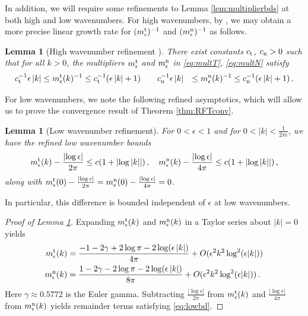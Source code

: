 \documentclass[11pt,reqno]{amsart}
\newcommand{\abs}[1]{\left\lvert #1 \right\rvert}
\numberwithin{equation}{section}
\newtheorem{lemma}[theorem]{Lemma}
\theoremstyle{definition}
\begin{document}
%
In addition, we will require some refinements to Lemma \ref{lem:multiplierbds} at both high and low wavenumbers. For high wavenumbers, by \cite[Proposition 1.4]{inverse}, we may obtain a more precise linear growth rate for $(m_\epsilon^{\rm t})^{-1}$ and $(m_\epsilon^{\rm n})^{-1}$ as follows.  
\begin{lemma}[High wavenumber refinement \cite{inverse}]\label{lem:highk_refinement}
There exist constants $c_{\rm t}$, $c_{\rm n}>0$ such that for all $k>0$, the multipliers $m_\epsilon^{\rm t}$ and $m_\epsilon^{\rm n}$ in \eqref{eq:multT}, \eqref{eq:multN} satisfy 
   \begin{equation}
   \begin{aligned}
    c_{\rm t}^{-1}\epsilon\abs{k} &\le m_\epsilon^{\rm t}(k)^{-1} \le c_{\rm t}^{-1}(\epsilon\abs{k}+1)
    \qquad
    c_{\rm n}^{-1}\epsilon\abs{k} &\le m_\epsilon^{\rm n}(k)^{-1} \le c_{\rm n}^{-1}(\epsilon\abs{k}+1)\,.
    \end{aligned}
  \end{equation}
\end{lemma}
%
%
For low wavenumbers, we note the following refined asymptotics, which will allow us to prove the convergence result of Theorem \ref{thm:RFTconv}. 
%
\begin{lemma}[Low wavenumber refinement]\label{lem:lowk_refine}
  For $0<\epsilon<1$ and for $0< \abs{k}<\frac{1}{2\pi\epsilon}$, we have the refined low wavenumber bounds
\begin{equation}\label{eq:lowbd}
  m_\epsilon^{\rm t}(k) - \frac{\abs{\log\epsilon}}{2\pi} \le c(1+\abs{\log \abs{k}})\,,
  \quad
  m_\epsilon^{\rm n}(k) - \frac{\abs{\log\epsilon}}{4\pi} \le c(1+\abs{\log \abs{k}})\,,
\end{equation}
along with $m_\epsilon^{\rm t}(0) - \frac{\abs{\log\epsilon}}{2\pi}=m_\epsilon^{\rm n}(0) - \frac{\abs{\log\epsilon}}{4\pi}=0$.
\end{lemma}
In particular, this difference is bounded independent of $\epsilon$ at low wavenumbers. 


\begin{proof}[Proof of Lemma \ref{lem:lowk_refine}]
Expanding $m_\epsilon^{\rm t}(k)$ and $m_\epsilon^{\rm n}(k)$ in a Taylor series about $\abs{k}=0$ yields 
\begin{equation}
\begin{aligned}
  m_\epsilon^{\rm t}(k) &= \frac{-1-2\gamma +2\log\pi -2\log(\epsilon \abs{k})}{4\pi} +O(\epsilon^2k^2\log^2(\epsilon |k|)) \\
  m_\epsilon^{\rm n}(k) &= \frac{1 - 2\gamma - 2\log\pi - 2\log(\epsilon \abs{k})}{8\pi} +O(\epsilon^2k^2\log^2(\epsilon |k|))\,.
\end{aligned}
\end{equation}
Here $\gamma\approx 0.5772$ is the Euler gamma. Subtracting $\frac{\abs{\log\epsilon}}{2\pi}$ from $m_\epsilon^{\rm t}(k)$ and $\frac{\abs{\log\epsilon}}{4\pi}$ from $m_\epsilon^{\rm n}(k)$ yields remainder terms satisfying \eqref{eq:lowbd}.
%
\end{proof}
\end{document}
